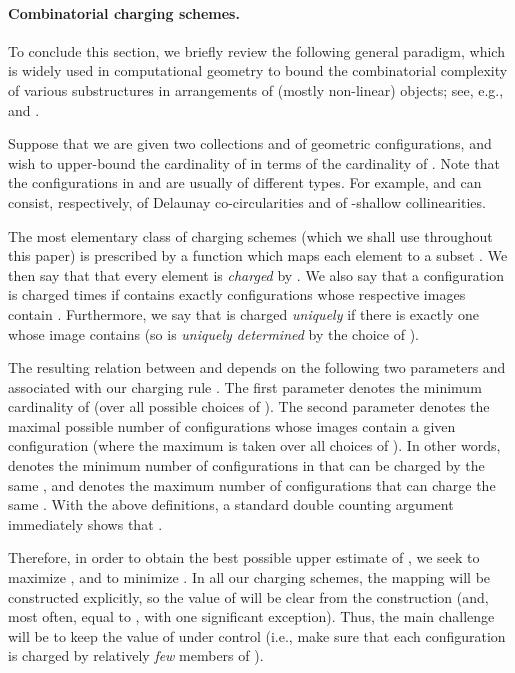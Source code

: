 \documentclass[letter,11pt]{article}
\begin{document}
\paragraph{Combinatorial charging schemes.}
To conclude this section, we briefly review the following general paradigm, which is widely used in computational geometry to bound the combinatorial complexity of various substructures in arrangements of (mostly non-linear) objects; see, e.g., \cite{Envelopes3D,ConstantLines} and \cite[Section 7]{SA95}.

Suppose that we are given two collections  and  of geometric configurations, and wish to upper-bound the cardinality  of  in terms of the cardinality  of .
Note that the configurations in  and  are usually of different types. For example,  and  can consist, respectively, of Delaunay co-circularities and of -shallow collinearities.

The most elementary class of charging schemes (which we shall use throughout this paper) is prescribed by a function  which maps each element  to a subset . 
We then say that that every element  is {\it charged} by .
We also say that a configuration  is charged  times if  contains exactly  configurations  whose respective images  contain . Furthermore, we say that  is charged {\it uniquely} if there is exactly one  whose image  contains  (so  is {\it uniquely determined} by the choice of ).


The resulting relation between  and  depends on the following two parameters  and  associated with our charging rule . The first parameter  denotes the minimum cardinality  of  (over all possible choices of ).
 The second parameter  denotes the maximal possible number  of configurations  whose images contain a given configuration  (where the maximum is taken over all choices of ).
In other words,  denotes the minimum number of configurations in  that can be charged by the same  , and  denotes the maximum number of configurations  that can charge the same .
With the above definitions, a standard double counting argument immediately shows that .

Therefore, in order to obtain the best possible upper estimate of , we seek to maximize , and to minimize 
. 
In all our charging schemes, the mapping  will be constructed explicitly, so the value of  will be clear from the construction (and, most often, equal to , with one significant exception). Thus, the main challenge will be to keep the value of  under control (i.e., make sure that each configuration  is charged by relatively {\it few} members of ).
\end{document}
